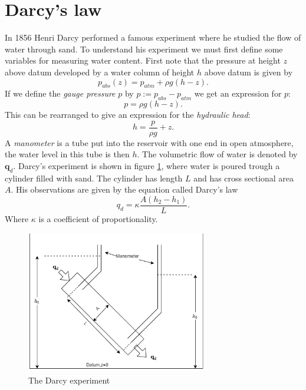 \documentclass[../Main/main.tex]{subfiles}
\begin{document}
\section*{Darcy's law}
In 1856 Henri Darcy performed a famous experiment where he studied the flow of water through sand. To understand his experiment we must first define some variables for measuring water content. First note that the pressure at height $z$ above datum developed by a water column of height $h$ above datum is given by
\begin{equation*}
p_{abs}(z) = p_{atm} + \rho g(h-z).
\end{equation*}
If we define the \emph{gauge pressure} $p$ by $p := p_{abs}-p_{atm}$ we get an expression for $p$:
\begin{equation*}
p = \rho g(h-z).
\end{equation*}
This can be rearranged to give an expression for the \emph{hydraulic head}:
\begin{equation}\label{eq:hydraulic}
h = \frac{p}{\rho g} + z.
\end{equation}
A \emph{manometer} is a tube put into the reservoir with one end in open atmosphere, the water level in this tube is then $h$. The volumetric flow of water is denoted by $\textbf{q}_d$. Darcy's experiment is shown in figure \ref{fig:darcy}, where water is poured trough a cylinder filled with sand. The cylinder has length $L$ and has cross sectional area $A$. His observations are given by the equation called Darcy's law
\begin{equation}
q_d = \kappa \frac{A(h_2-h_1)}{L}.
\end{equation}
Where $\kappa$ is a coefficient of proportionality.
\begin{figure}[h]
\centering
\includegraphics[width=0.7\textwidth]{Darcy experiment.png}
\caption{The Darcy experiment}
\label{fig:darcy}
\end{figure}
\end{document}
